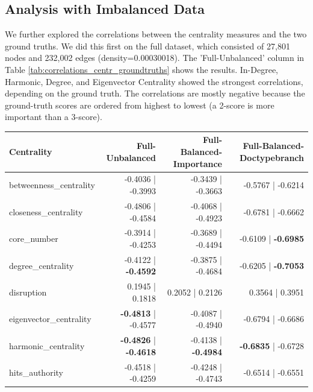 \documentclass[sigconf,authordraft]{acmart}
\begin{document}
\subsection{Analysis with Imbalanced Data}

We further explored the correlations between the centrality measures and the two ground truths. We did this first on the full dataset, which consisted of 27,801 nodes and 232,002 edges (density=0.00030018). The 'Full-Unbalanced' column in Table \ref{tab:correlations_centr_groundtruths} shows the results. In-Degree, Harmonic, Degree, and Eigenvector Centrality showed the strongest correlations, depending on the ground truth. The correlations are mostly negative because the ground-truth scores are ordered from highest to lowest (a 2-score is more important than a 3-score).


\begin{table}[t]
\centering
\small %
\renewcommand{\arraystretch}{1.2} %
\begin{tabular}{@{}p{4cm} r r r@{}}
\toprule
\textbf{Centrality} & \textbf{Full-Unbalanced} & \textbf{Full-Balanced-Importance} & \textbf{Full-Balanced-Doctypebranch} \\ \midrule
betweenness\_centrality           &           -0.4036 | -0.3993 &           -0.3439 | -0.3663 &           -0.5767 | -0.6214   \\
closeness\_centrality             &           -0.4806 | -0.4584 &           -0.4068 | -0.4923 &           -0.6781 | -0.6662   \\
core\_number                      &           -0.3914 | -0.4253 &           -0.3689 | -0.4494 &           -0.6109 | \textbf{-0.6985}   \\
degree\_centrality                &           -0.4122 | \textbf{-0.4592} &           -0.3875 | -0.4684 &  -0.6205 | \textbf{-0.7053}   \\
disruption                       &             0.1945 | 0.1818 &             0.2052 | 0.2126 &             0.3564 | 0.3951   \\
eigenvector\_centrality           &           \textbf{-0.4813} | -0.4577 &           -0.4087 | -0.4940 &           -0.6794 | -0.6686   \\
harmonic\_centrality              &           \textbf{-0.4826} | \textbf{-0.4618} &           -0.4138 | \textbf{-0.4984} &           \textbf{-0.6835} | -0.6728   \\
hits\_authority                   &           -0.4518 | -0.4259 &           -0.4248 | -0.4743 &           -0.6514 | -0.6551   \\

\end{tabular}
\end{table}
\end{document}
